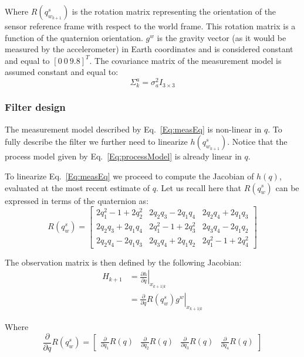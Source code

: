 \documentclass[12pt,a4paper,twoside]{article}
\begin{document}
  Where $R(q^{s}_{w_{k+1}})$ is the rotation matrix representing the orientation of the sensor reference frame with respect to the world frame. This rotation matrix is a function of the quaternion orientation. $g^{w}$ is the gravity vector (as it would be measured by the accelerometer) in Earth coordinates and is considered constant and equal to $[0~0~9.8]^T$. The covariance matrix of the measurement model is assumed constant and equal to:
  \begin{equation}
   \Sigma^{a}_{k} = \sigma^2_a I_{3\times3}
  \end{equation}

  \subsubsection{Filter design}
  The measurement model described by Eq.~\ref{Eq:measEq} is non-linear in $q$. To fully describe the filter we further need to linearize $h(q^{s}_{w_{k+1}})$. Notice that the process model given by Eq.~\ref{Eq:processModel} is already linear in $q$.

  To linearize Eq.~\ref{Eq:measEq} we proceed to compute the Jacobian of $h(q)$, evaluated at the most recent estimate of $q$. Let us recall here that $R(q^{s}_{w})$ can be expressed in terms of the quaternion as:
  \begin{equation}
   R(q^{s}_{w}) = \left[\begin{array}{ccc}
               2q^2_1-1+2q^2_2 & 2q_2q_3 - 2q_1q_4 & 2q_2q_4 + 2q_1q_3 \\
               2q_2q_3+2q_1q_4 & 2q^2_1-1+2q^2_3 & 2q_3q_4-2q_1q_2 \\
               2q_2q_4-2q_1q_3 & 2q_3q_4+2q_1q_2 & 2q^2_1-1+2q^2_4
              \end{array}\right]
  \end{equation}

  The observation matrix is then defined by the following Jacobian:
  \begin{align}
   H_{k+1} &= \left.\frac{\partial h}{\partial q} \right|_{x_{k+1|k}} \\
           &= \left.\frac{\partial}{\partial q} R(q^{s}_{w}) g^{w}\right|_{x_{k+1|k}}
  \end{align}

  Where
  \begin{equation}
  \frac{\partial}{\partial q} R(q^{s}_{w}) =\left[\begin{array}{cccc}
                                                \frac{\partial}{\partial q_1} R(q) & \frac{\partial}{\partial q_2} R(q) & \frac{\partial}{\partial q_3} R(q) & \frac{\partial}{\partial q_4} R(q)
                                               \end{array}\right]
  \end{equation}
\end{document}

